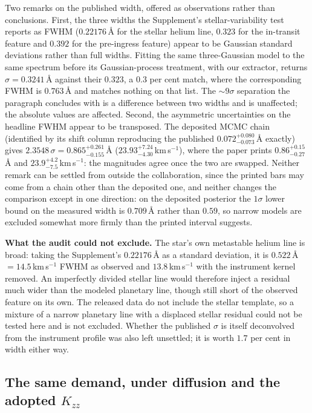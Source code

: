 \documentclass[english,a4paper]{my_memo}
\begin{document}
\medskip
\noindent Two remarks on the published width, offered as observations rather
than conclusions. First, the three widths the Supplement's
stellar-variability test reports as FWHM ($0.22176$\,\AA{} for the stellar
helium line, $0.323$ for the in-transit feature and $0.392$ for the
pre-ingress feature) appear to be Gaussian standard deviations rather than
full widths. Fitting the same three-Gaussian model to the same spectrum
before its Gaussian-process treatment, with our extractor, returns
$\sigma = 0.3241$\,\AA{} against their $0.323$, a $0.3$ per cent match, where
the corresponding FWHM is $0.763$\,\AA{} and matches nothing on that list.
The $\sim 9\sigma$ separation the paragraph concludes with is a difference
between two widths and is unaffected; the absolute values are affected.
Second, the asymmetric uncertainties on the headline FWHM appear to be
transposed. The deposited MCMC chain (identified by its shift column
reproducing the published $0.072^{+0.080}_{-0.073}$\,\AA{} exactly) gives
$2.3548\,\sigma = 0.865^{+0.261}_{-0.155}$\,\AA{}
($23.93^{+7.24}_{-4.30}$\,km\,s$^{-1}$), where the paper prints
$0.86^{+0.15}_{-0.27}$\,\AA{} and $23.9^{+4.2}_{-7.5}$\,km\,s$^{-1}$: the
magnitudes agree once the two are swapped. Neither remark can be settled from
outside the collaboration, since the printed bars may come from a chain other
than the deposited one, and neither changes the comparison except in one
direction: on the deposited posterior the $1\sigma$ lower bound on the
measured width is $0.709$\,\AA{} rather than $0.59$, so narrow models are
excluded somewhat more firmly than the printed interval suggests.

\medskip
\noindent\textbf{What the audit could not exclude.} The star's own metastable
helium line is broad: taking the Supplement's $0.22176$\,\AA{} as a standard
deviation, it is $0.522$\,\AA{} $= 14.5$\,km\,s$^{-1}$ FWHM as observed and
$13.8$\,km\,s$^{-1}$ with the instrument kernel removed. An imperfectly
divided stellar line would therefore inject a residual much wider than the
modeled planetary line, though still short of the observed feature on its
own. The released data do not include the stellar template, so a mixture of a
narrow planetary line with a displaced stellar residual could not be tested
here and is not excluded. Whether the published $\sigma$ is itself
deconvolved from the instrument profile was also left unsettled; it is worth
$1.7$ per cent in width either way.

\subsection{The same demand, under diffusion and the adopted $K_{zz}$}
\label{sec:diffbroad}
\end{document}
